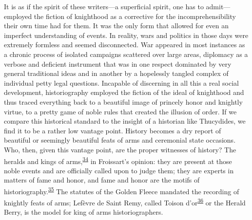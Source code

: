 It is as if the spirit of these writers---a superficial spirit, one has
to admit---employed the fiction of knighthood as a corrective for the
incomprehensibility their own time had for them. It was the only form
that allowed for even an imperfect understanding of events. In reality,
wars and politics in those days were extremely formless and seemed
disconnected. War appeared in most instances as a chronic process of
isolated campaigns scattered over large areas, diplomacy as a verbose
and deficient instrument that was in one respect dominated by very
general traditional ideas and in another by a hopelessly tangled complex
of individual petty legal questions. Incapable of discerning in all this
a real social development, historiography employed the fiction of the
ideal of knighthood and thus traced everything back to a beautiful image
of princely honor and knightly virtue, to a pretty game of noble rules
that created the illusion of order. If we compare this historical
standard to the insight of a historian like Thucydides, we find it to be
a rather low vantage point. History becomes a dry report of beautiful or
seemingly beautiful feats of arms and ceremonial state occasions. Who,
then, given this vantage point, are the proper witnesses of history? The
heralds and kings of
arms,\textsuperscript{\protect\hypertarget{10_Chapter_Three__THE_HEROIC_DREAM.xhtmlux5cux23id_1864}{\protect\hyperlink{23_NOTES.xhtmlux5cux23id_1865}{34}}}
in Froissart's opinion: they are present at those noble events and are
officially called upon to judge them; they are experts in matters of
fame and honor, and fame and honor are the motifs of
historiography.\textsuperscript{\protect\hypertarget{10_Chapter_Three__THE_HEROIC_DREAM.xhtmlux5cux23id_1863}{\protect\hyperlink{23_NOTES.xhtmlux5cux23page_406}{35}}}
The statutes of the Golden
\protect\hypertarget{10_Chapter_Three__THE_HEROIC_DREAM.xhtmlux5cux23page_73}{}{}Fleece
mandated the recording of knightly feats of arms; Lefèvre de Saint Remy,
called Toison
d'or\textsuperscript{\protect\hypertarget{10_Chapter_Three__THE_HEROIC_DREAM.xhtmlux5cux23id_1861}{\protect\hyperlink{23_NOTES.xhtmlux5cux23id_1862}{36}}}
or the Herald Berry, is the model for king of arms historiographers.

